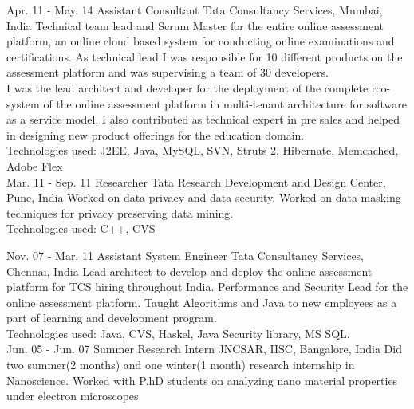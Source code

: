 \documentclass[]{cv-class}
\begin{document}
\begin{entrylist}
	 \entry
    {Apr. 11 - May. 14}
    {Assistant Consultant}
    {Tata Consultancy Services, Mumbai, India}
    {Technical team lead and Scrum Master for the entire online assessment platform, an online cloud based system for conducting online examinations and certifications. As technical lead I was responsible for 10 different products on the assessment platform and was supervising a team of 30 developers.\\
		I was the lead architect and developer for the deployment of the complete rco-system of the online assessment platform in multi-tenant architecture for software as a service model. I also contributed as technical expert in pre sales and helped in designing new product offerings for the education domain. \\
    Technologies used: J2EE, Java, MySQL, SVN, Struts 2, Hibernate, Memcached, Adobe Flex\\
		}
  \entry
    {Mar. 11 - Sep. 11}
    {Researcher}
    {Tata Research Development and Design Center, Pune, India}
    {Worked on data privacy and data security. Worked on data masking techniques for privacy preserving data mining. \\
     Technologies used: C++, CVS\\}


  \entry
    {Nov. 07 - Mar. 11}
    {Assistant System Engineer}
    {Tata Consultancy Services, Chennai, India}
    {Lead architect to develop and deploy the online assessment platform for TCS hiring throughout India. 
 Performance and Security Lead for the online assessment platform. Taught Algorithms and Java to new employees as a part of learning and development program.\\
  Technologies used: Java, CVS, Haskel, Java Security library, MS SQL.\\
	}
  \entry
    {Jun. 05 - Jun. 07}
    {Summer Research Intern}
    {JNCSAR, IISC, Bangalore, India}
    {
    Did two summer(2 months) and one winter(1 month) research internship in Nanoscience.
    Worked with P.hD students on analyzing nano material properties under electron microscopes.\\}
\end{entrylist}

\pagebreak
\end{document}
